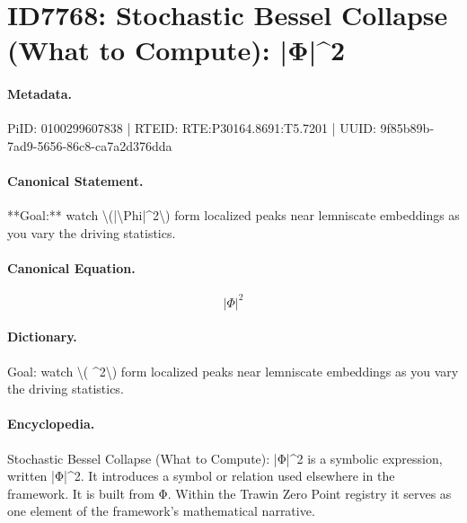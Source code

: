 \section*{ID7768: Stochastic Bessel Collapse (What to Compute): |Φ|\textasciicircum{}2}
\paragraph{Metadata.}
PiID: 0100299607838 | RTEID: RTE:P30164.8691:T5.7201 | UUID: 9f85b89b-7ad9-5656-86c8-ca7a2d376dda

\paragraph{Canonical Statement.}
**Goal:** watch \textbackslash{}(|\textbackslash{}Phi|\textasciicircum{}2\textbackslash{}) form localized peaks near lemniscate embeddings as you vary the driving statistics.

\paragraph{Canonical Equation.}
\[
|\Phi|^2
\]

\paragraph{Dictionary.}
Goal: watch \textbackslash{}( \textasciicircum{}2\textbackslash{}) form localized peaks near lemniscate embeddings as you vary the driving statistics.

\paragraph{Encyclopedia.}
Stochastic Bessel Collapse (What to Compute): |Φ|\textasciicircum{}2 is a symbolic expression, written |Φ|\textasciicircum{}2. It introduces a symbol or relation used elsewhere in the framework. It is built from Φ. Within the Trawin Zero Point registry it serves as one element of the framework's mathematical narrative.
